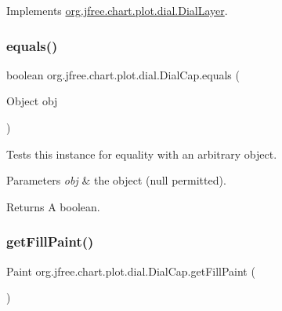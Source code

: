Implements \mbox{\hyperlink{interfaceorg_1_1jfree_1_1chart_1_1plot_1_1dial_1_1_dial_layer_aa4564e018317f0fdc7dbe85a46e7a4a4}{org.\+jfree.\+chart.\+plot.\+dial.\+Dial\+Layer}}.

\mbox{\label{classorg_1_1jfree_1_1chart_1_1plot_1_1dial_1_1_dial_cap_ad1696cbef8c9d3b9c37989e3c828b4c5}} 
\subsubsection{\texorpdfstring{equals()}{equals()}}
{\footnotesize\ttfamily boolean org.\+jfree.\+chart.\+plot.\+dial.\+Dial\+Cap.\+equals (\begin{DoxyParamCaption}\item[{Object}]{obj }\end{DoxyParamCaption})}

Tests this instance for equality with an arbitrary object.


\begin{DoxyParams}{Parameters}
{\em obj} & the object ({\ttfamily null} permitted).\\
\hline
\end{DoxyParams}
\begin{DoxyReturn}{Returns}
A boolean. 
\end{DoxyReturn}
\mbox{\label{classorg_1_1jfree_1_1chart_1_1plot_1_1dial_1_1_dial_cap_ada4f2b656e3b997bbdbdc50bc287ebc8}} 
\subsubsection{\texorpdfstring{get\+Fill\+Paint()}{getFillPaint()}}
{\footnotesize\ttfamily Paint org.\+jfree.\+chart.\+plot.\+dial.\+Dial\+Cap.\+get\+Fill\+Paint (\begin{DoxyParamCaption}{ }\end{DoxyParamCaption})}

